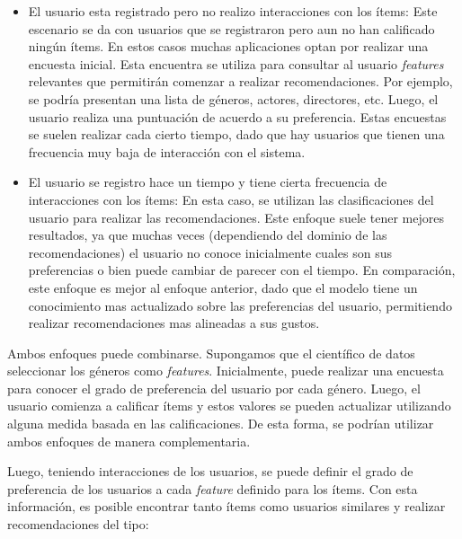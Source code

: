 \documentclass[11pt,a4paper,twoside]{thesis}
\begin{document}
\begin{itemize}
	\item El usuario esta registrado pero no realizo interacciones con los ítems: Este
	      escenario se da con usuarios que se registraron pero aun no han calificado
	      ningún ítems. En estos casos muchas aplicaciones optan por realizar una
	      encuesta inicial. Esta encuentra se utiliza para consultar al usuario
	      \textit{features} relevantes que permitirán comenzar a realizar
	      recomendaciones. Por ejemplo, se podría presentan una lista de géneros,
	      actores, directores, etc. Luego, el usuario realiza una puntuación de acuerdo a
	      su preferencia. Estas encuestas se suelen realizar cada cierto tiempo, dado que
	      hay usuarios que tienen una frecuencia muy baja de interacción con el sistema.
	\item El usuario se registro hace un tiempo y tiene cierta frecuencia de
	      interacciones con los ítems: En esta caso, se utilizan las clasificaciones del
	      usuario para realizar las recomendaciones. Este enfoque suele tener mejores
	      resultados, ya que muchas veces (dependiendo del dominio de las
	      recomendaciones) el usuario no conoce inicialmente cuales son sus preferencias
	      o bien puede cambiar de parecer con el tiempo. En comparación, este enfoque es
	      mejor al enfoque anterior, dado que el modelo tiene un conocimiento mas
	      actualizado sobre las preferencias del usuario, permitiendo realizar
	      recomendaciones mas alineadas a sus gustos.
\end{itemize}

Ambos enfoques puede combinarse. Supongamos que el científico de datos
seleccionar los géneros como \textit{features}. Inicialmente, puede realizar
una encuesta para conocer el grado de preferencia del usuario por cada género.
Luego, el usuario comienza a calificar ítems y estos valores se pueden
actualizar utilizando alguna medida basada en las calificaciones. De esta
forma, se podrían utilizar ambos enfoques de manera complementaria.

Luego, teniendo interacciones de los usuarios, se puede definir el grado de
preferencia de los usuarios a cada \textit{feature} definido para los ítems.
Con esta información, es posible encontrar tanto ítems como usuarios similares
y realizar recomendaciones del tipo:
\end{document}
